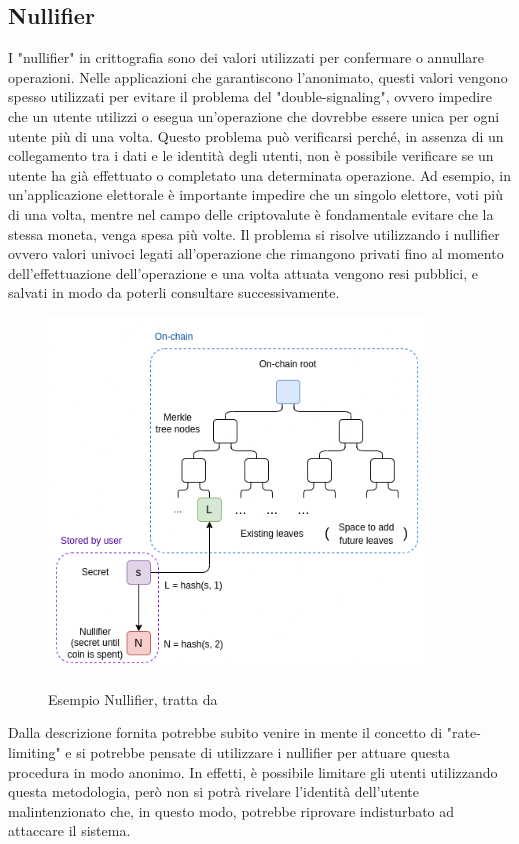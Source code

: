 \subsection{Nullifier}
I "nullifier" in crittografia sono dei valori utilizzati per confermare o annullare operazioni. Nelle applicazioni che garantiscono
l'anonimato, questi valori vengono spesso utilizzati per evitare il problema del "double-signaling", ovvero impedire che
un utente utilizzi o esegua un'operazione che dovrebbe essere unica per ogni utente più di una volta. Questo problema
può verificarsi perché, in assenza di un collegamento tra i dati e le identità degli utenti, non è possibile verificare
se un utente ha già effettuato o completato una determinata operazione. Ad esempio, in un'applicazione elettorale è
importante impedire che un singolo elettore, voti più di una volta, mentre nel campo delle criptovalute è fondamentale evitare che la
stessa moneta, venga spesa più volte. Il problema si risolve utilizzando i nullifier ovvero valori univoci legati
all'operazione che rimangono privati fino al momento dell'effettuazione dell'operazione e una volta attuata vengono
resi pubblici, e salvati in modo da poterli consultare successivamente.
\begin{figure}[H]
    \centering
    \includegraphics[width=10cm]{./chapters/2.rln-protocol/images/4.nullifier.png}
    \label{fig:nullifier}
    \captionsetup{justification=centering}
    \caption{Esempio Nullifier, tratta da \cite{some-ways-to-use-zk-snarks-for-privacy}}
\end{figure}
Dalla descrizione fornita potrebbe subito venire in mente il concetto di "rate-limiting" e si potrebbe pensate di
utilizzare i nullifier per attuare questa procedura in modo anonimo. In effetti, è possibile limitare gli
utenti utilizzando questa metodologia, però non si potrà rivelare l'identità dell'utente malintenzionato che, in questo
modo, potrebbe riprovare indisturbato ad attaccare il sistema.